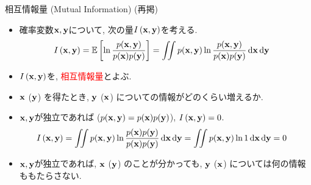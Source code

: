 \documentclass[dvipdfmx,notheorems,t]{beamer}
\begin{document}
\begin{frame}{相互情報量 (Mutual Information) (再掲)}
\begin{itemize}
  \item 確率変数$\vb{x}, \vb{y}$について, 次の量$I \left( \vb{x}, \vb{y} \right)$を考える.
  \begin{align*}
    I \left( \vb{x}, \vb{y} \right) &= \operatorname{\mathbb{E}} \left[ \ln \frac{p(\vb{x}, \vb{y})}{p(\vb{x}) p(\vb{y})} \right]
      = \iint p(\vb{x}, \vb{y}) \ln \frac{p(\vb{x}, \vb{y})}{p(\vb{x}) p(\vb{y})} \dd{\vb{x}} \dd{\vb{y}}
  \end{align*}
  \item $I \left( \vb{x}, \vb{y} \right)$を, \textcolor{red}{相互情報量}とよぶ.
  \item $\vb{x}$ ($\vb{y}$) を得たとき, $\vb{y}$ ($\vb{x}$) についての情報がどのくらい増えるか.
  \item $\vb{x}, \vb{y}$が独立であれば ($p(\vb{x}, \vb{y}) = p(\vb{x}) p(\vb{y})$), $I \left( \vb{x}, \vb{y} \right) = 0$.
  \begin{align*}
    I \left( \vb{x}, \vb{y} \right)
      &= \iint p(\vb{x}, \vb{y}) \ln \frac{p(\vb{x}) p(\vb{y})}{p(\vb{x}) p(\vb{y})} \dd{\vb{x}} \dd{\vb{y}}
      = \iint p(\vb{x}, \vb{y}) \ln 1 \dd{\vb{x}} \dd{\vb{y}} = 0
  \end{align*}
  \item $\vb{x}, \vb{y}$が独立であれば, $\vb{x}$ ($\vb{y}$) のことが分かっても,
  $\vb{y}$ ($\vb{x}$) については何の情報ももたらさない.
\end{itemize}
\end{frame}
\end{document}
